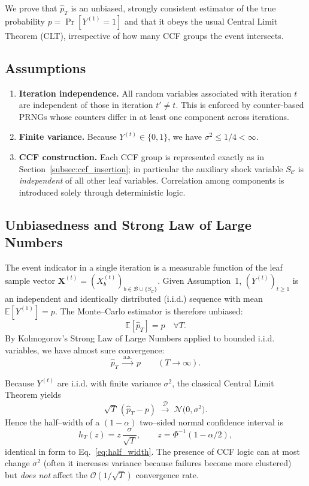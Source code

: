 We prove that $\widehat{p}_T$ is an unbiased, strongly consistent estimator of
the true probability $p=\Pr[Y^{(1)}=1]$ and that it obeys the usual Central
Limit Theorem (CLT), irrespective of how many CCF groups the event intersects.

\subsection{Assumptions}
\label{subsec:ccf_conv_assumptions}
\begin{enumerate}
  \item \textbf{Iteration independence.}  All random variables associated with
        iteration $t$ are independent of those in iteration $t'\ne t$.  This is
        enforced by counter-based PRNGs whose counters differ in at least one
        component across iterations.
  \item \textbf{Finite variance.}  Because $Y^{(t)}\in\{0,1\}$, we have 
        $\sigma^2\le 1/4<\infty$.
  \item \textbf{CCF construction.}  Each CCF group is represented exactly as in
        Section~\ref{subsec:ccf_insertion}; in particular the auxiliary shock
        variable $S_{\mathcal{C}}$ is \emph{independent} of all other leaf
        variables.  Correlation among components is introduced solely through
        deterministic logic.
\end{enumerate}

\subsection{Unbiasedness and Strong Law of Large Numbers}
The event indicator in a single iteration is a measurable function of the leaf
sample vector
$\mathbf{X}^{(t)}=(X_b^{(t)})_{b\in\mathcal{B}\cup\{S_{\mathcal{C}}\}}$.
Given Assumption~1, $(Y^{(t)})_{t\ge1}$ is an independent and identically
distributed (i.i.d.) sequence with mean $\mathbb{E}[Y^{(1)}]=p$.
The Monte--Carlo estimator is therefore unbiased:
\[\mathbb{E}[\widehat{p}_T]=p\quad\forall T.\]
By Kolmogorov's Strong Law of Large Numbers applied to bounded i.i.d.
variables, we have almost sure convergence:
\[\widehat{p}_T \;\xrightarrow{\text{a.s.}}\; p\qquad (T\to\infty).\]

Because $Y^{(t)}$ are i.i.d.
with finite variance $\sigma^2$, the classical Central Limit Theorem yields
\[\sqrt{T}\,(\widehat{p}_T-p)
    \;\xrightarrow{\mathcal{D}}\; \mathcal{N}\bigl(0,\sigma^2\bigr).
\]
Hence the half--width of a $(1-\alpha)$ two–sided normal confidence interval is
\[h_T(z)=z\,\frac{\sigma}{\sqrt{T}},\qquad
  z=\Phi^{-1}(1-\alpha/2),\]
identical in form to Eq.~\eqref{eq:half_width}.  The presence of CCF logic can
at most change $\sigma^2$ (often it increases variance because failures become
more clustered) but \emph{does not} affect the $\mathcal{O}(1/\sqrt{T})$
convergence rate.

